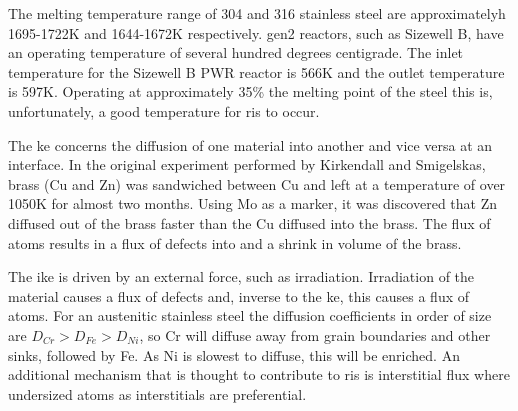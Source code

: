 The melting temperature range of 304 and 316 stainless steel are approximatelyh 1695-1722K and 1644-1672K respectively.  \acrshort{gen2} reactors, such as Sizewell B, have an operating temperature of several hundred degrees centigrade.  The inlet temperature for the Sizewell B PWR reactor is 566K\cite{sizewellbtemp} and the outlet temperature is 597K\cite{sizewellbtemp}.  Operating at approximately 35\% the melting point of the steel this is, unfortunately, a good temperature for \acrfull{ris} to occur.

The \acrfull{ke} concerns the diffusion of one material into another and vice versa at an interface.  In the original experiment performed by Kirkendall and Smigelskas, brass (\Gls{Cu} and Zn) was sandwiched between \Gls{Cu} and left at a temperature of over 1050K for almost two months.  Using \Gls{Mo} as a marker, it was discovered that \Gls{Zn} diffused out of the brass faster than the \Gls{Cu} diffused into the brass.  The flux of atoms results in a flux of defects into and a shrink in volume of the brass\cite{gswasike}.

The \acrfull{ike} is driven by an external force, such as irradiation.  Irradiation of the material causes a flux of defects and, inverse to the \acrshort{ke}, this causes a flux of atoms.  For an austenitic stainless steel the diffusion coefficients in order of size are $D_{Cr} > D_{Fe} > D_{Ni}$\cite{risfecrni}, so Cr will diffuse away from grain boundaries and other sinks, followed by Fe.  As Ni is slowest to diffuse, this will be enriched.  An additional mechanism that is thought to contribute to \acrshort{ris} is interstitial flux where undersized atoms as interstitials are preferential\cite{risfecrni}.

